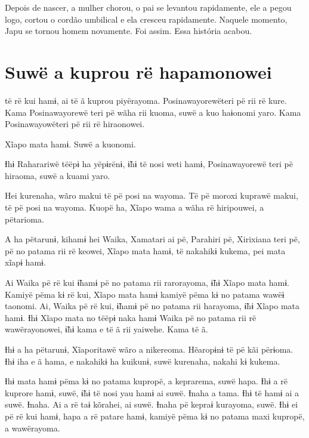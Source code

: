 Depois de nascer, a mulher chorou, o pai se levantou rapidamente, ele a
pegou logo, cortou o cordão umbilical e ela cresceu rapidamente. Naquele
momento, Japu se tornou homem novamente. Foi assim. Essa história
acabou.

\chapter{Suwë a kuprou rë hapamonowei}

 të rë kui hamɨ, ai të ã kuprou piyërayoma. Posinawayorewëteri pë rii
rë kure. Kama Posinawayorewë teri pë wãha rii kuoma, suwë a kuo haɨonomi
yaro. Kama Posinawayowëteri pë rii rë hiraonowei. 

Xĩapo mata hamɨ. Suwë a kuonomi. 

Ɨhɨ Raharariwë tëëpɨ ha yëpɨrënɨ, ɨ̃hɨ të nosi weti hamɨ, Posinawayorewë
teri pë hiraoma, suwë a kuami yaro. 

Hei kurenaha, wãro makui të pë posi na wayoma. Të pë moroxi kuprawë
makui, të pë posi na wayoma. Kuopë ha, Xĩapo wama a wãha rë hiripouwei,
a pëtarioma. 

A ha pëtarunɨ, kihamɨ hei Waika, Xamatari ai pë, Parahiri pë, Xirixiana
teri pë, pë no patama rii rë keowei, Xĩapo mata hamɨ, të nakahikɨ
kukema, pei mata xĩapɨ hamɨ. 


Ai Waika pë rë kui ɨ̃hamɨ pë no patama rii rarorayoma, ɨ̃hɨ Xĩapo mata
hamɨ. Kamiyë pëma kɨ rë kui, Xĩapo mata hamɨ kamiyë pëma kɨ no patama
wawëɨ taonomi. Ai, Waika pë rë kui, ɨ̃hamɨ pë no patama rii harayoma, ɨ̃hɨ
Xĩapo mata hamɨ. Ɨhɨ Xĩapo mata no tëëpɨ naka hamɨ Waika pë no patama
rii rë wawërayonowei, ɨ̃hɨ kama e të ã rii yaiwehe. Kama të ã. 

Ɨhɨ a ha pëtarunɨ, Xĩaporitawë wãro a nikereoma. Hẽaropɨnɨ të pë kãi
përɨoma. Ɨhɨ iha e ã hama, e nakahikɨ ha kuikunɨ, suwë kurenaha, nakahi
kɨ kukema. 


Ɨhɨ mata hamɨ pëma kɨ no patama kupropë, a keprarema, suwë hapa. Ɨhɨ a
rë kuprore hamɨ, suwë, ɨ̃hɨ të nosi yau hamɨ ai suwë. Ɨnaha a tama. Ɨhɨ
të hamɨ ai a suwë. Ɨnaha. Ai a rë taɨ kõrahei, ai suwë. Ɨnaha pë kepraɨ
kurayoma, suwë. Ɨhɨ ei pë rë kui hamɨ, hapa a rë patare hamɨ, kamiyë
pëma kɨ no patama maxi kupropë, a wawërayoma. 

